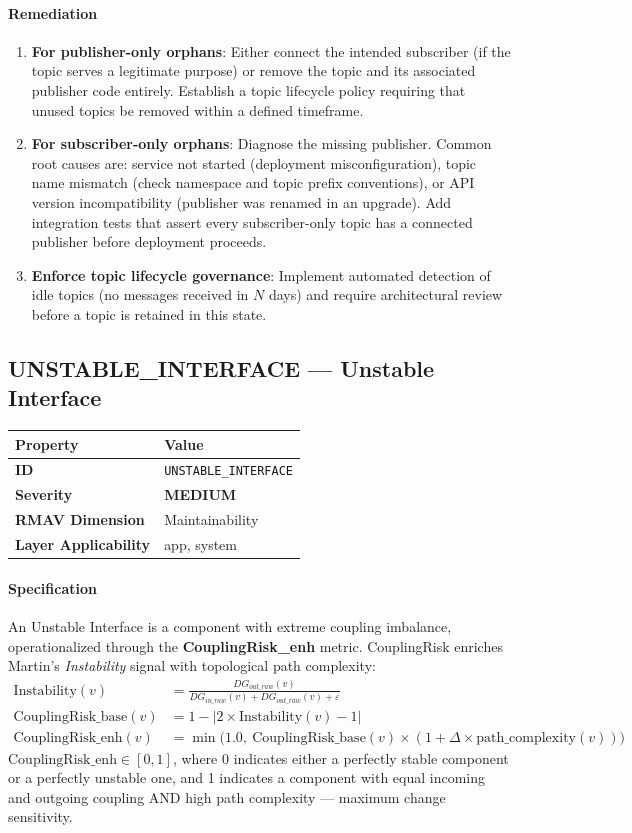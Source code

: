 \documentclass[11pt]{article}
\makeatletter
\newcommand{\MEDIUM}{\textcolor{yellow!50!black}{\textbf{MEDIUM}}}
\newcommand{\patternprop}[4]{%
  \begin{center}
  \begin{tabular}{@{}ll@{}}
  \toprule
  \textbf{Property} & \textbf{Value} \\
  \midrule
  \textbf{ID} & \texttt{#1} \\
  \textbf{Severity} & #2 \\
  \textbf{RMAV Dimension} & #3 \\
  \textbf{Layer Applicability} & #4 \\
  \bottomrule
  \end{tabular}
  \end{center}
}
\makeatother
\begin{document}
\paragraph{Remediation}
\begin{enumerate}[leftmargin=*]
\item \textbf{For publisher-only orphans}: Either connect the intended subscriber (if the topic serves a legitimate purpose) or remove the topic and its associated publisher code entirely. Establish a topic lifecycle policy requiring that unused topics be removed within a defined timeframe.
\item \textbf{For subscriber-only orphans}: Diagnose the missing publisher. Common root causes are: service not started (deployment misconfiguration), topic name mismatch (check namespace and topic prefix conventions), or API version incompatibility (publisher was renamed in an upgrade). Add integration tests that assert every subscriber-only topic has a connected publisher before deployment proceeds.
\item \textbf{Enforce topic lifecycle governance}: Implement automated detection of idle topics (no messages received in $N$ days) and require architectural review before a topic is retained in this state.
\end{enumerate}

\subsection{UNSTABLE\_INTERFACE --- Unstable Interface}
\patternprop{UNSTABLE\_INTERFACE}{\MEDIUM}{Maintainability}{app, system}

\paragraph{Specification}
An Unstable Interface is a component with extreme coupling imbalance, operationalized through the \textbf{CouplingRisk\_enh} metric. CouplingRisk enriches Martin's \emph{Instability} signal with topological path complexity:
\begin{align*}
\mathrm{Instability}(v) &= \frac{DG_{out\_raw}(v)}{DG_{in\_raw}(v) + DG_{out\_raw}(v) + \varepsilon} \\
\mathrm{CouplingRisk\_base}(v) &= 1 - |2 \times \mathrm{Instability}(v) - 1| \\
\mathrm{CouplingRisk\_enh}(v) &= \min\big(1.0,\ \mathrm{CouplingRisk\_base}(v) \times (1 + \Delta \times \mathrm{path\_complexity}(v))\big)
\end{align*}
$\mathrm{CouplingRisk\_enh} \in [0,1]$, where 0 indicates either a perfectly stable component or a perfectly unstable one, and 1 indicates a component with equal incoming and outgoing coupling AND high path complexity --- maximum change sensitivity.
\end{document}
